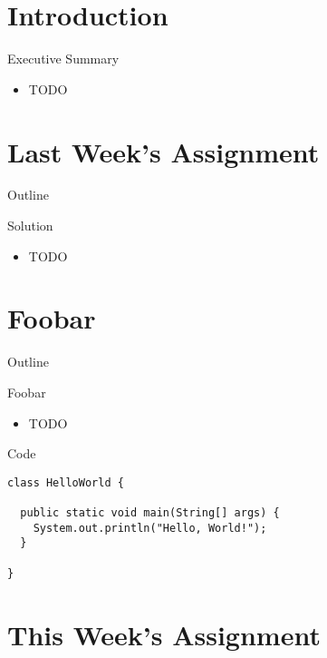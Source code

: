 \note{
}


\section*{Introduction}

\begin{frame}{Executive Summary}
  \begin{itemize}
  \item TODO
  \end{itemize}
\end{frame}


\section{Last Week's Assignment}

\begin{frame}{Outline}
  \tableofcontents[current]
\end{frame}

\begin{frame}{Solution}
  \begin{itemize}
  \item TODO
  \end{itemize}
\end{frame}


\section{Foobar}

\begin{frame}{Outline}
  \tableofcontents[current]
\end{frame}

\begin{frame}{Foobar}
  \begin{itemize}
  \item TODO
  \end{itemize}
\end{frame}

\begin{frame}[fragile]{Code}
  \begin{lstlisting}
class HelloWorld {

  public static void main(String[] args) {
    System.out.println("Hello, World!");
  }

}
  \end{lstlisting}
\end{frame}


\section{This Week's Assignment}

